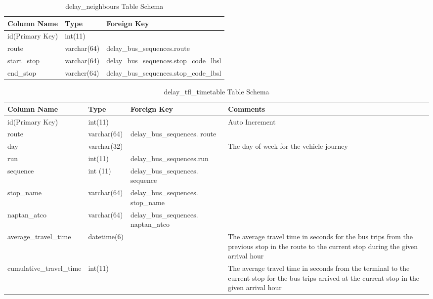 \begin{appendices}
\begin{table}
\centering
\begin{tabular}{@{}lll@{}} \toprule
Column Name & Type & Foreign Key\\ \midrule
id(Primary Key) & int(11)  \\
route & varchar(64) & delay\_bus\_sequences.route \\
start\_stop & varchar(64) & delay\_bus\_sequences.stop\_code\_lbsl\\
end\_stop & varcher(64) & delay\_bus\_sequences.stop\_code\_lbsl\\
\bottomrule
\end{tabular}
\caption{delay\_neighbours Table Schema}
\label{table:delay_neighbours}
\end{table}

\begin{table}
\centering
\begin{tabular}{@{}llp{4cm}p{4cm}@{}} \toprule
Column Name & Type & Foreign Key & Comments\\ \midrule
id(Primary Key) & int(11) & & Auto Increment\\ [0.4cm]
route & varchar(64) & delay\_bus\_sequences. route \\ [0.4cm]
day & varchar(32) & & The day of week for the vehicle journey \\ [0.4cm]
run & int(11) & delay\_bus\_sequences.run \\ [0.4cm]
sequence & int (11) & delay\_bus\_sequences. sequence \\ [0.4cm]
stop\_name & varchar(64) & delay\_bus\_sequences. stop\_name \\ [0.4cm]
naptan\_atco & varchar(64) & delay\_bus\_sequences. naptan\_atco \\ [0.4cm]
average\_travel\_time & datetime(6) & & The average travel time in seconds for the bus trips from the previous stop in the route to the current stop during the given arrival hour \\ [0.4cm]
cumulative\_travel\_time & int(11) & & The average travel time in seconds from the terminal to the current stop for the bus trips arrived at the current stop in the given arrival hour \\
\bottomrule
\end{tabular}
\caption{delay\_tfl\_timetable Table Schema}
\label{table:delay_tfl_timetable}
\end{table}

\end{appendices}


